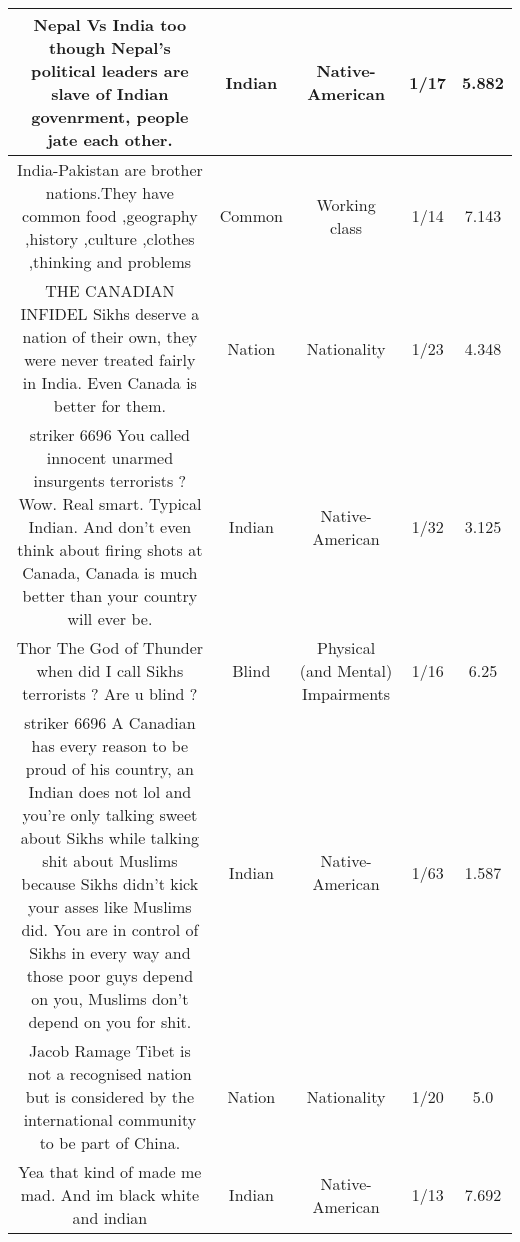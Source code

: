 \documentclass[11pt]{article}
\newlength\mylength
\begin{document}
\begin{center}
\begin{longtable}{|C{.40\mylength}|C{.30\mylength}|C{.15\mylength}|C{.15\mylength}|C{.15\mylength}|}
  Nepal Vs India too though Nepal's political leaders are slave of Indian govenrment, people jate each other.  & Indian & Native-American & 1/17 & 5.882 \\  \hline
  India-Pakistan are brother nations.They have common food ,geography ,history ,culture ,clothes ,thinking and problems      & Common & Working class & 1/14 & 7.143 \\  \hline
   THE CANADIAN INFIDEL  Sikhs deserve a nation of their own, they were never treated fairly in India. Even Canada is better for them.  & Nation & Nationality & 1/23 & 4.348 \\  \hline
   striker 6696  You called innocent unarmed insurgents  terrorists ? Wow. Real smart. Typical Indian. And don't even think about firing shots at Canada, Canada is much better than your country will ever be.  & Indian & Native-American & 1/32 & 3.125 \\  \hline
  Thor The God of Thunder when did I call Sikhs terrorists ? Are u blind ?  & Blind & Physical (and Mental) Impairments & 1/16 & 6.25 \\  \hline
   striker 6696  A Canadian has every reason to be proud of his country, an Indian does not lol   and you're only talking sweet about Sikhs while talking shit about Muslims because Sikhs didn't kick your asses like Muslims did. You are in control of Sikhs in every way and those poor guys depend on you, Muslims don't depend on you for shit.  & Indian & Native-American & 1/63 & 1.587 \\  \hline
    Jacob Ramage Tibet is not a recognised nation but is considered by the international community to be part of China.  & Nation & Nationality & 1/20 & 5.0 \\  \hline
  Yea that kind of made me mad. And im black white and indian  & Indian & Native-American & 1/13 & 7.692 \\  \hline

\end{longtable}
\end{center}
\end{document}
